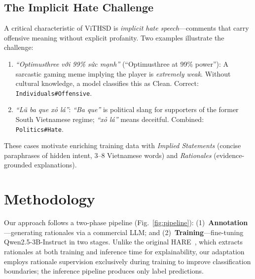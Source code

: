 \documentclass[conference]{IEEEtran}
\begin{document}
\subsection{The Implicit Hate Challenge}

A critical characteristic of ViTHSD is \textit{implicit hate speech}---comments
that carry offensive meaning without explicit profanity. Two examples illustrate
the challenge:

\begin{enumerate}[leftmargin=*]
\item \foreignlanguage{vietnamese}{\textit{``Optimusthree với 99\% sức mạnh''}}
(``Optimusthree at 99\% power''): A sarcastic gaming meme implying the player is
\textit{extremely weak}. Without cultural knowledge, a model classifies this as
Clean. Correct: \texttt{Individuals\#Offensive}.

\item \foreignlanguage{vietnamese}{\textit{``Lũ ba que xỏ lá''}}:
\foreignlanguage{vietnamese}{\textit{``Ba que''}} is political slang for
supporters of the former South Vietnamese regime;
\foreignlanguage{vietnamese}{\textit{``xỏ lá''}} means deceitful. Combined:
\texttt{Politics\#Hate}.
\end{enumerate}

These cases motivate enriching training data with \textit{Implied Statements}
(concise paraphrases of hidden intent, 3--8 Vietnamese words) and
\textit{Rationales} (evidence-grounded explanations).


\section{Methodology}\label{sec:method}

Our approach follows a two-phase pipeline (Fig.~\ref{fig:pipeline}):
(1)~\textbf{Annotation}---generating rationales via a commercial LLM; and
(2)~\textbf{Training}---fine-tuning Qwen2.5-3B-Instruct in two stages.
Unlike the original HARE~\cite{Yang2023HARE}, which extracts rationales at both
training and inference time for explainability, our adaptation employs rationale
supervision exclusively during training to improve classification boundaries;
the inference pipeline produces only label predictions.
\end{document}
